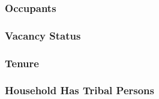 \subsubsection{Occupants}\label{occupants}


\subsubsection{Vacancy Status}\label{vacancy_status}


\subsubsection{Tenure}\label{tenure}


\subsubsection{Household Has Tribal Persons}\label{household_has_tribal_persons}


